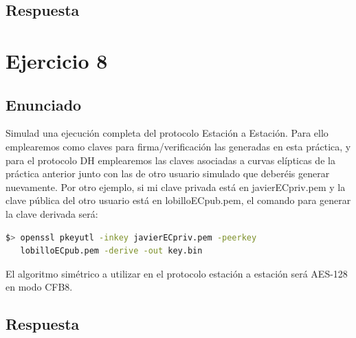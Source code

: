 \documentclass[10pt,a4paper,spanish]{report}
\begin{document}
\section{Respuesta}
\noindent

\chapter{Ejercicio 8}

\section{Enunciado}
\noindent
Simulad una ejecución completa del protocolo Estación a Estación. Para ello emplearemos como claves para firma/verificación las generadas en esta práctica, y para el protocolo DH emplearemos las claves asociadas a curvas elípticas de la práctica anterior junto con las de otro usuario simulado que deberéis generar nuevamente. Por otro ejemplo, si mi clave privada está en javierECpriv.pem y la clave pública del otro usuario está en lobilloECpub.pem, el comando para generar la clave derivada será:

\begin{lstlisting}[language=bash]
$> openssl pkeyutl -inkey javierECpriv.pem -peerkey
   lobilloECpub.pem -derive -out key.bin
\end{lstlisting}

\noindent
El algoritmo simétrico a utilizar en el protocolo estación a estación será AES-128 en modo CFB8.


\section{Respuesta}
\noindent
\end{document}
